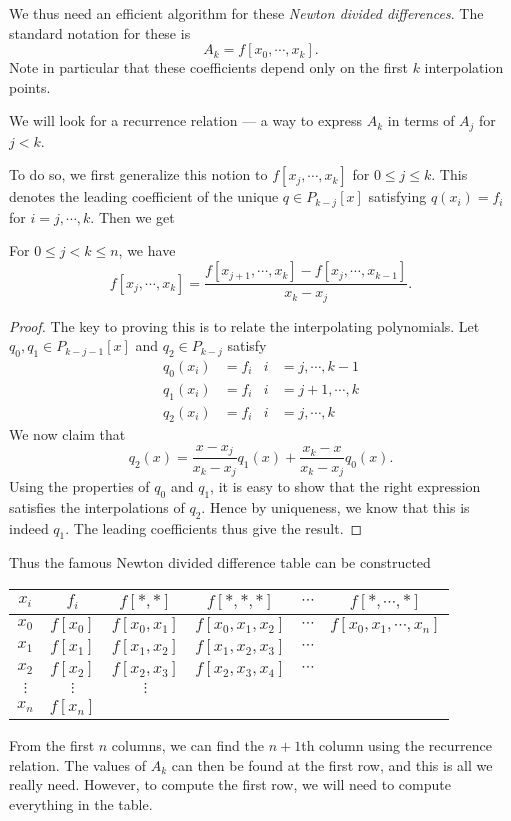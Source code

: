 \documentclass[a4paper]{article}
\begin{document}
We thus need an efficient algorithm for these \emph{Newton divided differences}. The standard notation for these is
\[
  A_k = f[x_0, \cdots, x_k].
\]
Note in particular that these coefficients depend only on the first $k$ interpolation points.

We will look for a recurrence relation --- a way to express $A_k$ in terms of $A_j$ for $j < k$.

To do so, we first generalize this notion to $f[x_j, \cdots, x_k]$ for $0 \leq j \leq k$. This denotes the leading coefficient of the unique $q \in P_{k - j}[x]$ satisfying $q(x_i) = f_i$ for $i = j, \cdots, k$. Then we get
\begin{thm}
  For $0 \leq j < k \leq n$, we have
  \[
    f[x_j, \cdots, x_k] = \frac{f[x_{j + 1}, \cdots, x_k] - f[x_j, \cdots, x_{k - 1}]}{x_k - x_j}.
  \]
\end{thm}

\begin{proof}
  The key to proving this is to relate the interpolating polynomials. Let $q_0, q_1 \in P_{k - j - 1}[x]$ and $q_2 \in P_{k - j}$ satisfy
  \begin{align*}
    q_0(x_i) &= f_i & i &=j, \cdots, k - 1\\
    q_1(x_i) &= f_i & i &=j + 1, \cdots, k\\
    q_2(x_i) &= f_i & i &=j, \cdots, k
  \end{align*}
  We now claim that
  \[
    q_2(x) = \frac{x - x_j}{x_k - x_j} q_1(x) + \frac{x_k - x}{x_k - x_j} q_0(x).
  \]
  Using the properties of $q_0$ and $q_1$, it is easy to show that the right expression satisfies the interpolations of $q_2$. Hence by uniqueness, we know that this is indeed $q_1$. The leading coefficients thus give the result.
\end{proof}
Thus the famous Newton divided difference table can be constructed
\begin{center}
  \begin{tabular}{cccccc}
    \toprule
    $x_i$ & $f_i$ & $f[*, *]$ & $f[*, *, *]$ & $\cdots$ & $f[*, \cdots,*]$\\
    \midrule
    $x_0$ & $f[x_0]$ & $f[x_0, x_1]$ & $f[x_0, x_1, x_2]$ & $\cdots$ & $f[x_0, x_1, \cdots, x_n]$\\
    $x_1$ & $f[x_1]$ & $f[x_1, x_2]$ & $f[x_1, x_2, x_3]$ & $\cdots$\\
    $x_2$ & $f[x_2]$ & $f[x_2, x_3]$ & $f[x_2, x_3, x_4]$ & $\cdots$\\
    $\vdots$ & $\vdots$ & $\vdots$ &\\
    $x_n$ & $f[x_n]$\\
    \bottomrule
  \end{tabular}
\end{center} %
From the first $n$ columns, we can find the $n + 1$th column using the recurrence relation. The values of $A_k$ can then be found at the first row, and this is all we really need. However, to compute the first row, we will need to compute everything in the table.
\end{document}
